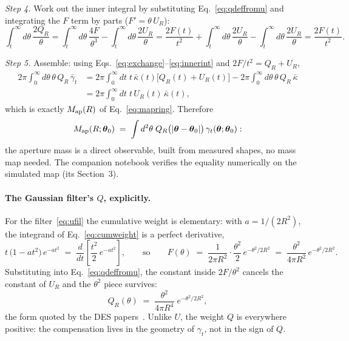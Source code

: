 \documentclass[11pt]{article}
\newcommand{\Map}{M_{\rm ap}}
\newcommand{\Ufil}{U_R}
\newcommand{\Qfil}{Q_R}
\newcommand{\btheta}{\boldsymbol{\theta}}
\numberwithin{equation}{section}
\begin{document}
\emph{Step 4.}  Work out the inner integral by substituting
Eq.~\eqref{eq:qdeffromu} and integrating the $F$ term by parts
($F' = \theta\,\Ufil$):
\begin{equation}
  \int_t^\infty d\theta\,\frac{2\Qfil}{\theta}
  = \int_t^\infty d\theta\,\frac{4F}{\theta^3}
  - \int_t^\infty d\theta\,\frac{2\Ufil}{\theta}
  = \frac{2F(t)}{t^2}
  + \int_t^\infty d\theta\,\frac{2\Ufil}{\theta}
  - \int_t^\infty d\theta\,\frac{2\Ufil}{\theta}
  = \frac{2F(t)}{t^2} .
  \label{eq:innerint}
\end{equation}

\emph{Step 5.}  Assemble: using
Eqs.~\eqref{eq:exchange}--\eqref{eq:innerint} and
$2F/t^2 = \Qfil + \Ufil$,
\begin{equation}
\begin{split}
  2\pi \int_0^\infty d\theta\,\theta\, \Qfil\,\bar\gamma_t
  &= 2\pi \int_0^\infty dt\; t\,\bar\kappa(t)
  \bigl[\Qfil(t) + \Ufil(t)\bigr]
  - 2\pi \int_0^\infty d\theta\,\theta\, \Qfil\,\bar\kappa \\
  &= 2\pi \int_0^\infty dt\; t\, \Ufil(t)\, \bar\kappa(t) ,
\end{split}
  \label{eq:qassemble}
\end{equation}
which is exactly $\Map(R)$ of Eq.~\eqref{eq:mapring}.  Therefore
\begin{equation}
  \Map(R;\btheta_0)
  \;=\; \int d^2\theta\;
  \Qfil\bigl(|\btheta - \btheta_0|\bigr)\,
  \gamma_t(\btheta;\btheta_0) :
  \label{eq:qrelation}
\end{equation}
the aperture mass is a direct observable, built from measured
shapes, no mass map needed.  The companion notebook verifies the
equality numerically on the simulated map (its Section~3).

\paragraph{The Gaussian filter's $Q$, explicitly.}
For the filter~\eqref{eq:ufil} the cumulative weight is elementary:
with $a = 1/(2R^2)$, the integrand of Eq.~\eqref{eq:cumweight} is a
perfect derivative,
\begin{equation}
  t\,\bigl(1 - a t^2\bigr)\, e^{-a t^2}
  \;=\; \frac{d}{dt}\left[\frac{t^2}{2}\, e^{-a t^2}\right],
  \qquad\text{so}\qquad
  F(\theta) \;=\; \frac{1}{2\pi R^2}\cdot
  \frac{\theta^2}{2}\, e^{-\theta^2/2R^2}
  \;=\; \frac{\theta^2}{4\pi R^2}\, e^{-\theta^2/2R^2} .
  \label{eq:fgauss}
\end{equation}
Substituting into Eq.~\eqref{eq:qdeffromu}, the constant inside
$2F/\theta^2$ cancels the constant of $\Ufil$ and the $\theta^2$
piece survives:
\begin{equation}
  \Qfil(\theta)
  \;=\; \frac{\theta^2}{4\pi R^4}\;
  e^{-\theta^2/2R^2} ,
  \label{eq:qfil}
\end{equation}
the form quoted by the DES papers~\cite{GomesTATT}.  Unlike $U$, the
weight $Q$ is everywhere positive: the compensation lives in the
geometry of $\gamma_t$, not in the sign of $Q$.
\end{document}

